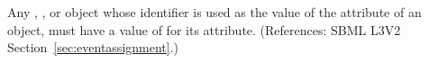 Any \Compartment, \Species, \Parameter or \SpeciesReference object whose
identifier is used as the value of the attribute  of an
\EventAssignment object, must have a value of  for its
 attribute.  (References: SBML L3V2
Section~\ref{sec:eventassignment}.)

